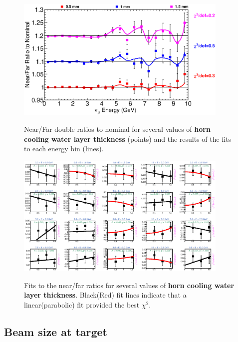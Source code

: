 \begin{figure}[ht]
  \begin{center}
    {\includegraphics[width=4.0in]{figures/NominalWaterLayer__nof_summary.eps}}
  \end{center}
\caption{ Near/Far double ratios to nominal for several values of {\bf horn cooling water layer thickness} (points) and the results of the fits to each energy bin (lines).}
\end{figure}

\begin{figure}[hb]
  \begin{center}
    {\includegraphics[width=4.0in]{figures/NominalWaterLayer__nof_fits.eps}}
  \end{center}
\caption{ Fits to the near/far ratios for several values of {\bf horn cooling water layer thickness}. Black(Red) fit lines indicate that a linear(parabolic) fit provided the best $\chi^2$. }
\end{figure}

\clearpage
\subsection{Beam size at target}

